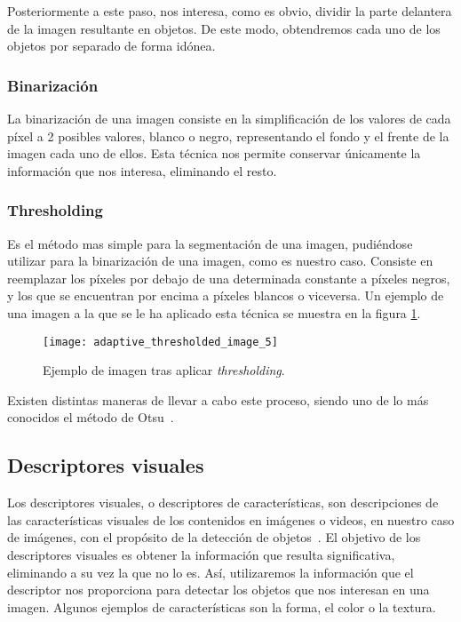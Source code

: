 Posteriormente a este paso, nos interesa, como es obvio, dividir la parte delantera de la imagen resultante en objetos. De este modo, obtendremos cada uno de los objetos por separado de forma idónea.

\subsubsection{Binarización}

La binarización de una imagen consiste en la simplificación de los valores de cada píxel a 2 posibles valores, blanco o negro, representando el fondo y el frente de la imagen cada uno de ellos. Esta técnica nos permite conservar únicamente la información que nos interesa, eliminando el resto.

\subsubsection{Thresholding}

Es el método mas simple para la segmentación de una imagen, pudiéndose utilizar para la binarización de una imagen, como es nuestro caso. Consiste en reemplazar los píxeles por debajo de una determinada constante a píxeles negros, y los que se encuentran por encima a píxeles blancos o viceversa. Un ejemplo de una imagen a la que se le ha aplicado esta técnica se muestra en la figura \ref{fig:3.2.1}.

\begin{figure}
\centering
\texttt{[image: adaptive\_thresholded\_image\_5]}
\caption{Ejemplo de imagen tras aplicar \textit{thresholding}.}
\label{fig:3.2.1}
\end{figure}

Existen distintas maneras de llevar a cabo este proceso, siendo uno de lo más conocidos el método de Otsu~\cite{wiki:otsu}.

\subsection{Descriptores visuales}

Los descriptores visuales, o descriptores de características, son descripciones de las características visuales de los contenidos en imágenes o videos, en nuestro caso de imágenes, con el propósito de la detección de objetos~\cite{wiki:visualdescriptor}. El objetivo de los descriptores visuales es obtener la información que resulta significativa, eliminando a su vez la que no lo es. Así, utilizaremos la información que el descriptor nos proporciona para detectar los objetos que nos interesan en una imagen. Algunos ejemplos de características son la forma, el color o la textura.

